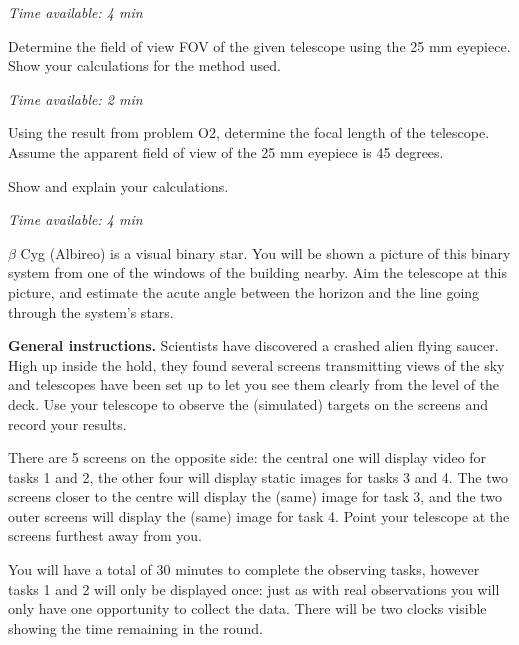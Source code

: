 \emph{Time available: 4 min}

Determine the field of view FOV of the given telescope using the 25 mm
eyepiece. Show your calculations for the method used.

\emph{Time available: 2 min}

Using the result from problem O2, determine the focal length of the
telescope. Assume the apparent field of view of the 25 mm eyepiece is 45
degrees.

Show and explain your calculations.

\emph{Time available: 4 min}

$\beta$ Cyg (Albireo) is a visual binary star. You will be shown a picture
of this binary system from one of the windows of the building nearby. Aim
the telescope at this picture, and estimate the acute angle between the
horizon and the line going through the system's stars.

\textbf{General instructions.} Scientists have discovered a crashed alien
flying saucer. High up inside the hold, they found several screens
transmitting views of the sky and telescopes have been set up to let you see
them clearly from the level of the deck. Use your telescope to observe the
(simulated) targets on the screens and record your results.

There are 5 screens on the opposite side: the central one will display video
for tasks 1 and 2, the other four will display static images for tasks 3 and
4. The two screens closer to the centre will display the (same) image for
task 3, and the two outer screens will display the (same) image for task 4.
Point your telescope at the screens furthest away from you.

You will have a total of 30 minutes to complete the observing tasks, however
tasks 1 and 2 will only be displayed once: just as with real observations
you will only have one opportunity to collect the data. There will be two
clocks visible showing the time remaining in the round.

